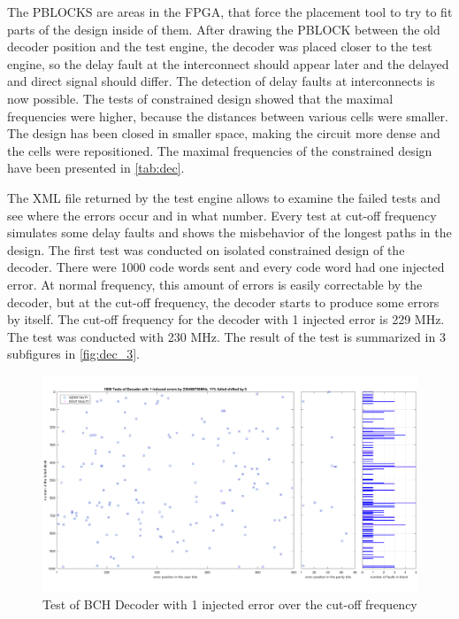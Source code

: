 The PBLOCKS are areas in the FPGA, that force the placement tool to try to fit parts of the design inside of them. After drawing the PBLOCK between the old decoder position and the test engine, the decoder was placed closer to the test engine, so the delay fault at the interconnect should appear later and the delayed and direct signal should differ. The detection of delay faults at interconnects is now possible. The tests of constrained design showed that the maximal frequencies were higher, because the distances between various cells were smaller. The design has been closed in smaller space, making the circuit more dense and the cells were repositioned. The maximal frequencies of the constrained design have been presented in \autoref{tab:dec}.

The XML file returned by the test engine allows to examine the failed tests and see where the errors occur and in what number. Every test at cut-off frequency simulates some delay faults and shows the misbehavior of the longest paths in the design. The first test was conducted on isolated constrained design of the decoder. There were 1000 code words sent and every code word had one injected error. At normal frequency, this amount of errors is easily correctable by the decoder, but at the cut-off frequency, the decoder starts to produce some errors by itself. The cut-off frequency for the decoder with 1 injected error is 229 MHz. The test was conducted with 230 MHz. The result of the test is summarized in 3 subfigures in \autoref{fig:dec_3}. 


\begin{figure}[h]
\centering
\includegraphics[width=\textwidth]{figures/1000_tests_decoder_overtacted_230_1_error.png}
\caption{Test of BCH Decoder with 1 injected error over the cut-off frequency}
\label{fig:dec_3}
\end{figure}

